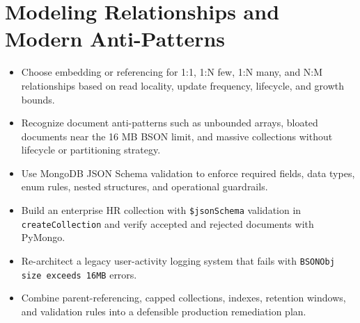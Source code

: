 \chapter{Modeling Relationships and Modern Anti-Patterns}
%

\begin{objectives}
\begin{itemize}
    \item Choose embedding or referencing for 1:1, 1:N few, 1:N many, and N:M relationships based on read locality, update frequency, lifecycle, and growth bounds.
    \item Recognize document anti-patterns such as unbounded arrays, bloated documents near the 16 MB BSON limit, and massive collections without lifecycle or partitioning strategy.
    \item Use MongoDB JSON Schema validation to enforce required fields, data types, enum rules, nested structures, and operational guardrails.
    \item Build an enterprise HR collection with \texttt{\$jsonSchema} validation in \texttt{createCollection} and verify accepted and rejected documents with PyMongo.
    \item Re-architect a legacy user-activity logging system that fails with \texttt{BSONObj size exceeds 16MB} errors.
    \item Combine parent-referencing, capped collections, indexes, retention windows, and validation rules into a defensible production remediation plan.
\end{itemize}
\end{objectives}

